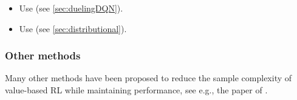 \begin{itemize}
\item Use
   (see \cref{sec:duelingDQN}).

\item Use
  (see \cref{sec:distributional}).
  

\end{itemize}

\subsubsection{Other methods}

Many other methods have been proposed to reduce the sample complexity
of value-based RL while maintaining performance,
see e.g., the  paper of
\citep{Kapturowski2022}.





